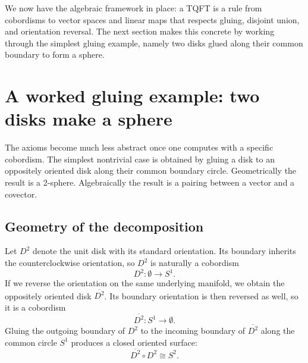 \medskip

\noindent We now have the algebraic framework in place: a TQFT is a rule from cobordisms to vector spaces and linear maps that respects gluing, disjoint union, and orientation reversal. The next section makes this concrete by working through the simplest gluing example, namely two disks glued along their common boundary to form a sphere.

\section{A worked gluing example: two disks make a sphere}\label{sec:two-disks-sphere}

The axioms become much less abstract once one computes with a specific cobordism. The simplest nontrivial case is obtained by gluing a disk to an oppositely oriented disk along their common boundary circle. Geometrically the result is a 2-sphere. Algebraically the result is a pairing between a vector and a covector.

\subsection{Geometry of the decomposition}

Let $D^2$ denote the unit disk with its standard orientation. Its boundary inherits the counterclockwise orientation, so $D^2$ is naturally a cobordism
\begin{equation}\label{eq:disk-outgoing}
D^2 : \emptyset \longrightarrow S^1.
\end{equation}
If we reverse the orientation on the same underlying manifold, we obtain the oppositely oriented disk $\overline{D^2}$. Its boundary orientation is then reversed as well, so it is a cobordism
\begin{equation}\label{eq:disk-incoming}
\overline{D^2} : S^1 \longrightarrow \emptyset.
\end{equation}
Gluing the outgoing boundary of $D^2$ to the incoming boundary of $\overline{D^2}$ along the common circle $S^1$ produces a closed oriented surface:
\begin{equation}\label{eq:sphere-from-disks}
\overline{D^2} \circ D^2 \cong S^2.
\end{equation}

